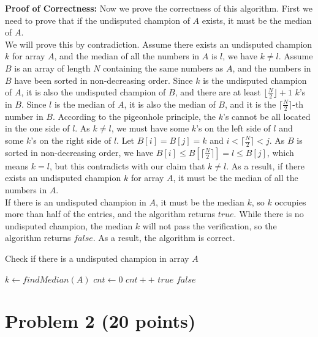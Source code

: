 \documentclass[letterpaper, 11pt]{article}
\begin{document}
\textbf{Proof of Correctness:} Now we prove the correctness of this algorithm. First we need to prove that if the undisputed champion of $A$ exists, it must be the median of $A$. \\
We will prove this by contradiction. Assume there exists an undisputed champion $k$ for array $A$, and the median of all the numbers in $A$ is $l$, we have $k \neq l$. Assume $B$ is an array of length $N$ containing the same numbers as $A$, and the numbers in $B$ have been sorted in non-decreasing order. Since $k$ is the undisputed champion of $A$, it is also the undisputed champion of $B$, and there are at least $\lfloor \frac{N}{2} \rfloor + 1$ $k$'s in $B$. Since $l$ is the median of $A$, it
is also the median of $B$, and it is the $\lceil \frac{N}{2} \rceil$-th number in $B$. According to the pigeonhole principle, the $k$'s cannot be all located in the one side of $l$. As $k \neq l$, we must have some $k$'s on the left side of $l$ and some $k$'s on the right side of $l$. Let $B[i]=B[j]=k$ and $i < \lceil \frac{N}{2} \rceil < j$. As $B$ is sorted in non-decreasing order, we have $B[i] \le B[\lceil \frac{N}{2} \rceil] = l \le B[j]$, which means $k=l$, but this contradicts
with our claim that $k \neq l$. As a result, if there exists an undisputed champion $k$ for array $A$, it must be the median of all the numbers in $A$.\\
If there is an undisputed champion in $A$, it must be the median $k$, so $k$ occupies more than half of the entries, and the algorithm returns $true$. While there is no undisputed champion, the median $k$ will not pass the verification, so the algorithm returns $false$. As a result, the algorithm is correct.

\begin{algorithm}
\label{algo:champion}
\caption{Check if there is a undisputed champion in array $A$}
\begin{algorithmic}[1]
    \STATE $k \leftarrow findMedian(A)$ 
    \STATE $cnt \leftarrow 0$
            \STATE $cnt++$
        \ENDIF
    \ENDFOR
        \RETURN $true$
    \ELSE
        \RETURN $false$
    \ENDIF
\end{algorithmic}
\end{algorithm}

\section{Problem 2 (20 points)}
\end{document}
